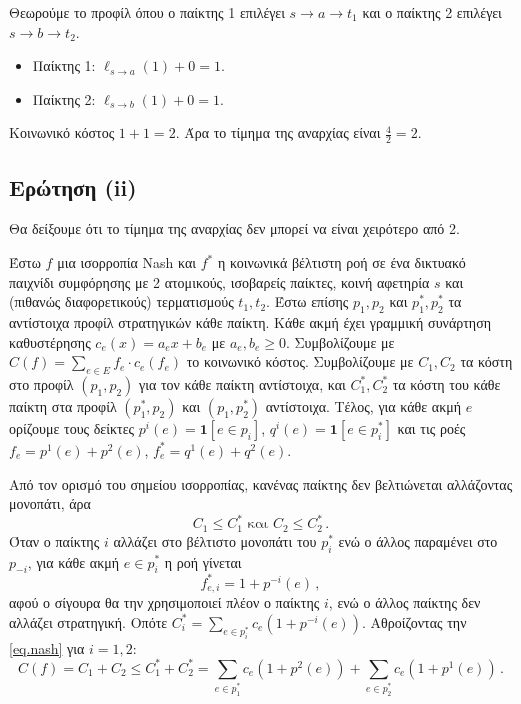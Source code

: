 Θεωρούμε το προφίλ όπου ο παίκτης 1 επιλέγει $s \to a \to t_1$ και ο παίκτης 2
επιλέγει $s \to b \to t_2$.
\begin{itemize}
  \item Παίκτης 1: $\ell_{s \to a}(1) + 0 = 1$.
  \item Παίκτης 2: $\ell_{s \to b}(1) + 0 = 1$.
\end{itemize}
Κοινωνικό κόστος $1 + 1 = 2$. Άρα το τίμημα της αναρχίας είναι
$\frac{4}{2} = 2$.

\subsection{Ερώτηση (ii)}

Θα δείξουμε ότι το τίμημα της αναρχίας δεν μπορεί να είναι χειρότερο από 2.

Έστω $f$ μια ισορροπία Nash και $f^*$ η κοινωνικά βέλτιστη ροή σε ένα δικτυακό
παιχνίδι συμφόρησης με 2 ατομικούς, ισοβαρείς παίκτες, κοινή αφετηρία $s$ και
(πιθανώς διαφορετικούς) τερματισμούς $t_1, t_2$. Έστω επίσης $p_1, p_2$ και
$p_1^*, p_2^*$ τα αντίστοιχα προφίλ στρατηγικών κάθε παίκτη. Κάθε ακμή έχει
γραμμική συνάρτηση καθυστέρησης $c_e(x) = a_e x + b_e$ με $a_e, b_e \geq 0$.
Συμβολίζουμε με $C(f) = \sum_{e \in E} f_e \cdot c_e(f_e)$ το κοινωνικό κόστος.
Συμβολίζουμε με $C_1, C_2$ τα κόστη στο προφίλ $(p_1, p_2)$ για τον κάθε παίκτη
αντίστοιχα, και $C_1^*, C_2^*$ τα κόστη του κάθε παίκτη στα προφίλ
$(p_1^*, p_2)$ και $(p_1, p_2^*)$ αντίστοιχα. Τέλος, για κάθε ακμή $e$ ορίζουμε
τους δείκτες $p^i(e) = \mathbf{1}[e \in p_i]$, $q^i(e) = \mathbf{1}[e \in p_i^*]$
και τις ροές $f_e = p^1(e) + p^2(e)$, $f_e^* = q^1(e) + q^2(e)$.

Από τον ορισμό του σημείου ισορροπίας, κανένας παίκτης δεν βελτιώνεται
αλλάζοντας μονοπάτι, άρα
\begin{equation}\label{eq.nash}
  C_1 \leq C_1^* \text{ και } C_2 \leq C_2^* \,.
\end{equation}
Όταν ο παίκτης $i$ αλλάζει στο βέλτιστο μονοπάτι του $p_i^*$ ενώ ο άλλος
παραμένει στο $p_{-i}$, για κάθε ακμή $e \in p_i^*$ η ροή γίνεται
\begin{equation}\label{eq.flow}
  f_{e, i}^* = 1 + p^{-i}(e) \,,
\end{equation}
αφού ο σίγουρα θα την χρησιμοποιεί πλέον ο παίκτης $i$, ενώ ο άλλος παίκτης δεν
αλλάζει στρατηγική. Οπότε
$C_i^* = \sum_{e \in p_i^*} c_e(1 + p^{-i}(e))$. Αθροίζοντας την \eqref{eq.nash}
για $i = 1, 2$:
\begin{equation}\label{eq.sum}
  C(f) = C_1 + C_2 \leq C_1^* + C_2^* = \sum_{e \in p_1^*} c_e(1 + p^2(e))
    + \sum_{e \in p_2^*} c_e(1 + p^1(e)) \,.
\end{equation}

